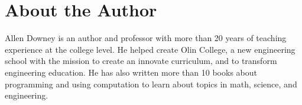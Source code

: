 \documentclass{book}
\begin{document}
\thispagestyle{empty}

\null\vskip1.175in

\section*{About the Author}
Allen Downey is an author and professor with more than 20 years of teaching experience at the college level. He helped create Olin College, a new engineering school with the mission to create an innovate curriculum, and to transform engineering education. He has also written more than 10 books about programming and using computation to learn about topics in math, science, and engineering.

\tableofcontents



\mainmatter


































\printindex
\end{document}
